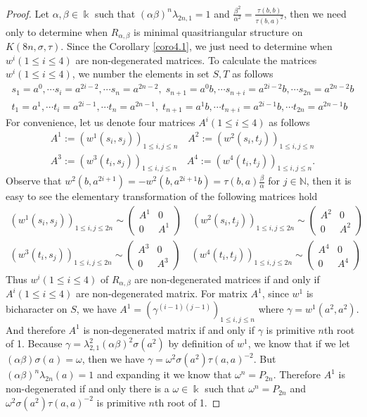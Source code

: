 \documentclass[a4paper,11pt]{amsart}
\numberwithin{equation}{section}
\begin{document}
\begin{proof}
\iffalse
Let $\alpha,\beta \in \Bbbk$ such that $(\alpha\beta)^n\lambda_{2n,1}=1$ and $\frac{\beta^2}{\alpha^2}=\frac{\tau(b,b)}{\tau(b,a)^2}$, then we need only to determine when $R_{\alpha,\beta}$ is minimal quasitriangular structure on $K(8n,\sigma,\tau)$. Since the Corollary \ref{coro4.1}, we just need to determine when $w^i(1\leq i\leq4)$ are non-degenerated matrices. To calculate the matrices $w^{i}(1\leq i\leq4)$, we number the elements in set $S,T$ as follows
\begin{gather*}
s_1=a^0,\cdots s_i=a^{2i-2},\cdots s_n=a^{2n-2},\;s_{n+1}=a^0b,\cdots s_{n+i}=a^{2i-2}b,\cdots s_{2n}=a^{2n-2}b\\
t_1=a^1,\cdots t_i=a^{2i-1},\cdots t_n=a^{2n-1},\;t_{n+1}=a^1b,\cdots t_{n+i}=a^{2i-1}b,\cdots t_{2n}=a^{2n-1}b
\end{gather*}
For convenience, let us denote four matrices $A^{i}(1\leq i\leq4)$ as follows
\begin{gather*}
A^1:=(w^1(s_i,s_j))_{1\leq i,j \leq n} \quad A^2:=(w^2(s_i,t_j))_{1\leq i,j \leq n}\\ A^3:=(w^3(t_i,s_j))_{1\leq i,j \leq n}\quad A^4:=(w^4(t_i,t_j))_{1\leq i,j \leq n}.
\end{gather*}
Observe that $w^2(b,a^{2i+1})=-w^2(b,a^{2i+1}b)=\tau(b,a)\frac{\beta}{\alpha}$ for $j\in \mathbb{N}$, then it is easy to see the elementary transformation of the following matrices hold
\begin{gather*}
(w^1(s_i,s_j))_{1\leq i,j \leq 2n} \sim \begin{pmatrix} A^1 & 0 \\ 0 & A^1 \end{pmatrix} \quad (w^2(s_i,t_j))_{1\leq i,j \leq 2n}\sim \begin{pmatrix} A^2 & 0 \\ 0 & A^2 \end{pmatrix} \\ (w^3(t_i,s_j))_{1\leq i,j \leq 2n} \sim \begin{pmatrix} A^3 & 0 \\ 0 & A^3 \end{pmatrix} \quad (w^4(t_i,t_j))_{1\leq i,j \leq 2n}\sim \begin{pmatrix} A^4 & 0 \\ 0 & A^4 \end{pmatrix}
\end{gather*}
Thus $w^i(1\leq i\leq4)$ of $R_{\alpha,\beta}$ are non-degenerated matrices if and only if $A^{i}(1\leq i\leq4)$ are non-degenerated matrix. For matrix $A^1$, since $w^1$ is bicharacter on $S$, we have $A^1=(\gamma^{(i-1)(j-1)})_{1\leq i,j \leq n}$ where $\gamma=w^1(a^2,a^2)$. And therefore $A^1$ is non-degenerated matrix if and only if $\gamma$ is primitive $n$th root of 1. Because $\gamma=\lambda_{2,1}^2(\alpha\beta)^2\sigma(a^2)$ by definition of $w^1$, we know that if we let $(\alpha\beta)\sigma(a)=\omega$, then we have $\gamma=\omega^2 \sigma(a^2)\tau(a,a)^{-2}$. But $(\alpha\beta)^n\lambda_{2n}(a)=1$ and expanding it we know that $\omega^n=P_{2n}$. Therefore $A^1$ is non-degenerated if and only there is a $\omega \in \Bbbk$ such that $\omega^n=P_{2n}$ and $\omega^2 \sigma(a^2)\tau(a,a)^{-2}$ is primitive $n$th root of 1.

\end{proof}
\end{document}
